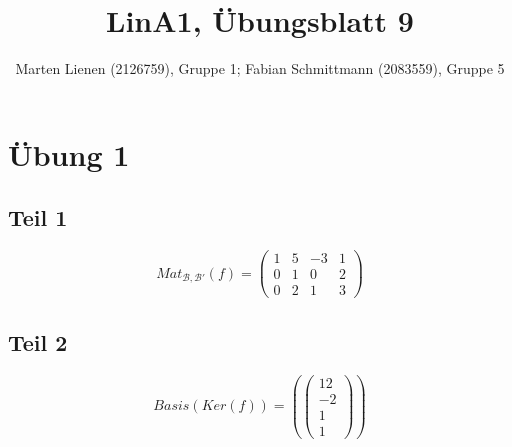 \documentclass[a4paper,10pt]{article}
\title{LinA1, Übungsblatt 9}
\author{Marten Lienen (2126759), Gruppe 1; Fabian Schmittmann (2083559), Gruppe 5}
\begin{document}
\maketitle

\section*{Übung 1}

\subsection*{Teil 1}

\begin{equation}
 Mat_{\mathcal{B}, \mathcal{B}'}(f) =
   \begin{pmatrix}
    1 & 5 & -3 & 1\\
    0 & 1 & 0 & 2\\
    0 & 2 & 1 & 3
   \end{pmatrix}
\end{equation}

\subsection*{Teil 2}

\begin{equation}
 Basis(Ker(f)) = (\begin{pmatrix}12\\-2\\1\\1\end{pmatrix})
\end{equation}
\end{document}

